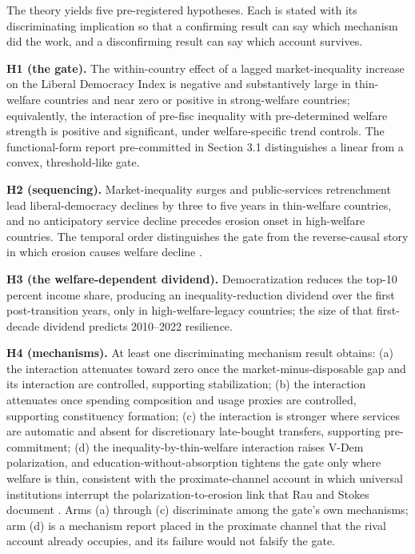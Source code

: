 \documentclass[11pt,letterpaper]{article}
\begin{document}
The theory yields five pre-registered hypotheses. Each is stated with its discriminating implication so that a confirming result can say which mechanism did the work, and a disconfirming result can say which account survives.

\textbf{H1 (the gate).} The within-country effect of a lagged market-inequality increase on the Liberal Democracy Index is negative and substantively large in thin-welfare countries and near zero or positive in strong-welfare countries; equivalently, the interaction of pre-fisc inequality with pre-determined welfare strength is positive and significant, under welfare-specific trend controls. The functional-form report pre-committed in Section 3.1 distinguishes a linear from a convex, threshold-like gate.

\textbf{H2 (sequencing).} Market-inequality surges and public-services retrenchment lead liberal-democracy declines by three to five years in thin-welfare countries, and no anticipatory service decline precedes erosion onset in high-welfare countries. The temporal order distinguishes the gate from the reverse-causal story in which erosion causes welfare decline \citep{SzikraOktem2023}.

\textbf{H3 (the welfare-dependent dividend).} Democratization reduces the top-10 percent income share, producing an inequality-reduction dividend over the first post-transition years, only in high-welfare-legacy countries; the size of that first-decade dividend predicts 2010--2022 resilience.

\textbf{H4 (mechanisms).} At least one discriminating mechanism result obtains: (a) the interaction attenuates toward zero once the market-minus-disposable gap and its interaction are controlled, supporting stabilization; (b) the interaction attenuates once spending composition and usage proxies are controlled, supporting constituency formation; (c) the interaction is stronger where services are automatic and absent for discretionary late-bought transfers, supporting pre-commitment; (d) the inequality-by-thin-welfare interaction raises V-Dem polarization, and education-without-absorption tightens the gate only where welfare is thin, consistent with the proximate-channel account in which universal institutions interrupt the polarization-to-erosion link that Rau and Stokes document \citep{RauStokes2025}. Arms (a) through (c) discriminate among the gate's own mechanisms; arm (d) is a mechanism report placed in the proximate channel that the rival account already occupies, and its failure would not falsify the gate.
\end{document}
